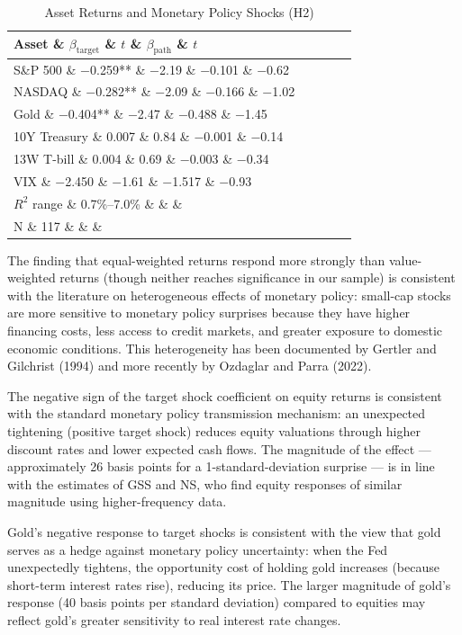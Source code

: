 \begin{table}[htbp]
\centering
\caption{Asset Returns and Monetary Policy Shocks (H2)}
\label{tab:h2}
\begin{tabular}{lcccc}
\toprule
Asset \& $\beta_{\text{target}}$ \& $t$ \& $\beta_{\text{path}}$ \& $t$ \\
\midrule
S\&P 500 \& $-$0.259** \& $-$2.19 \& $-$0.101 \& $-$0.62 \\
NASDAQ \& $-$0.282** \& $-$2.09 \& $-$0.166 \& $-$1.02 \\
Gold \& $-$0.404** \& $-$2.47 \& $-$0.488 \& $-$1.45 \\
10Y Treasury \& 0.007 \& 0.84 \& $-$0.001 \& $-$0.14 \\
13W T-bill \& 0.004 \& 0.69 \& $-$0.003 \& $-$0.34 \\
VIX \& $-$2.450 \& $-$1.61 \& $-$1.517 \& $-$0.93 \\
\midrule
$R^2$ range \& 0.7\%--7.0\% \& \& \& \\
N \& 117 \& \& \& \\
\bottomrule
\end{tabular}
\par\vspace{2pt}{\footnotesize Newey-West HAC standard errors with lag=4. ** $p < 0.05$. N = 117 for all assets.}
\end{table}


The finding that equal-weighted returns respond more strongly than value-weighted returns (though neither reaches significance in our sample) is consistent with the literature on heterogeneous effects of monetary policy: small-cap stocks are more sensitive to monetary policy surprises because they have higher financing costs, less access to credit markets, and greater exposure to domestic economic conditions. This heterogeneity has been documented by Gertler and Gilchrist (1994) and more recently by Ozdaglar and Parra (2022).

The negative sign of the target shock coefficient on equity returns is consistent with the standard monetary policy transmission mechanism: an unexpected tightening (positive target shock) reduces equity valuations through higher discount rates and lower expected cash flows. The magnitude of the effect --- approximately 26 basis points for a 1-standard-deviation surprise --- is in line with the estimates of GSS and NS, who find equity responses of similar magnitude using higher-frequency data.

Gold's negative response to target shocks is consistent with the view that gold serves as a hedge against monetary policy uncertainty: when the Fed unexpectedly tightens, the opportunity cost of holding gold increases (because short-term interest rates rise), reducing its price. The larger magnitude of gold's response (40 basis points per standard deviation) compared to equities may reflect gold's greater sensitivity to real interest rate changes.


